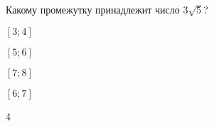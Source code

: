 \begin{ex}
	Какому промежутку принадлежит число $3\sqrt{5}$?
	
	\selectanswer
	\begin{enumcols}[columns=4]
		\item $[3;4]$
		\item $[5;6]$
		\item $[7;8]$
		\item $[6;7]$
	\end{enumcols}
	\begin{answer}
		4
	\end{answer}
\end{ex}